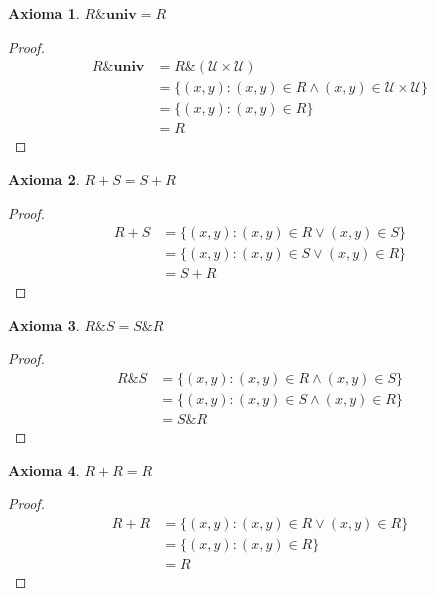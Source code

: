 \documentclass{article}
\newtheorem*{axiom}{Axioma}
\newcommand{\U}{\mathcal{U}}
\newcommand{\univ}{\textbf{univ}}
\begin{document}
\begin{axiom} 
  $R \& \univ = R$
\end{axiom}
\begin{proof}
  \begin{equation*}
    \begin{aligned}
      R \& \univ &= R \& (\U \times \U) \\ 
                 &= \{(x, y) : (x, y) \in R \land (x, y) \in \U \times \U\} \\ 
                 &= \{(x, y) : (x, y) \in R\} \\ 
                 &= R
    \end{aligned}
  \end{equation*}
\end{proof}

\begin{axiom}
  $R+S = S+R$
\end{axiom}
\begin{proof}
  \begin{equation*}
    \begin{aligned}
      R+S &= \{(x, y) : (x, y) \in R \lor (x, y) \in S\} \\ 
          &= \{(x, y) : (x, y) \in S \lor (x, y) \in R\} \\ 
          &= S+R
    \end{aligned}
  \end{equation*}
\end{proof}

\begin{axiom}
  $R \& S = S \& R$
\end{axiom}
\begin{proof}
  \begin{equation*}
    \begin{aligned}
      R \& S &= \{(x, y) : (x, y) \in R \land (x, y) \in S\} \\ 
             &= \{(x, y) : (x, y) \in S \land (x, y) \in R\} \\ 
             &= S \& R 
    \end{aligned}
  \end{equation*}
\end{proof}

\begin{axiom}
  $R + R = R$
\end{axiom}
\begin{proof}
  \begin{equation*}
    \begin{aligned}
      R + R &= \{(x, y) : (x, y) \in R \lor (x, y) \in R\} \\ 
            &= \{(x, y) : (x, y) \in R\} \\ 
            &= R
    \end{aligned}
  \end{equation*}
\end{proof}
\end{document}
